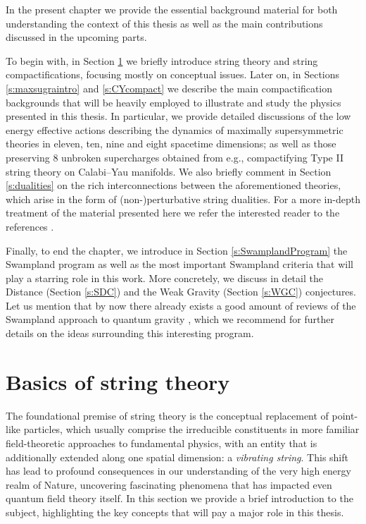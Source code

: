In the present chapter we provide the essential background material for both understanding the context of this thesis as well as the main contributions discussed in the upcoming parts.

To begin with, in Section \ref{s:basicconcepts} we briefly introduce string theory and string compactifications, focusing mostly on conceptual issues. Later on, in Sections \ref{s:maxsugraintro} and \ref{s:CYcompact} we describe the main compactification backgrounds that will be heavily employed to illustrate and study the physics presented in this thesis. In particular, we provide detailed discussions of the low energy effective actions describing the dynamics of maximally supersymmetric theories in eleven, ten, nine and eight spacetime dimensions; as well as those preserving 8 unbroken supercharges obtained from e.g., compactifying Type II string theory on Calabi--Yau manifolds. We also briefly comment in Section \ref{s:dualities} on the rich interconnections between the aforementioned theories, which arise in the form of (non-)perturbative string dualities. For a more in-depth treatment of the material presented here we refer the interested reader to the references \cite{Green:2012oqa,Green:2012pqa,Aspinwall:1996mn,Polchinski:1998rq,Polchinski:1998rr,Hori:2003ic,Becker:2006dvp,Ibanez:2012zz,Blumenhagen:2013fgp}.

Finally, to end the chapter, we introduce in Section \ref{s:SwamplandProgram} the Swampland program as well as the most important Swampland criteria that will play a starring role in this work. More concretely, we discuss in detail the Distance (Section \ref{s:SDC}) and the Weak Gravity (Section \ref{s:WGC}) conjectures. Let us mention that by now there already exists a good amount of reviews of the Swampland approach to quantum gravity \cite{Brennan:2017rbf,Palti:2019pca,vanBeest:2021lhn,Grana:2021zvf,Harlow:2022gzl,Agmon:2022thq,VanRiet:2023pnx}, which we recommend for further details on the ideas surrounding this interesting program.



\section{Basics of string theory} \label{s:basicconcepts}

The foundational premise of string theory is the conceptual replacement of point-like particles, which usually comprise the irreducible constituents in more familiar field-theoretic approaches to fundamental physics, with an entity that is additionally extended along one spatial dimension: a \emph{vibrating string}. This shift has lead to profound consequences in our understanding of the very high energy realm of Nature, uncovering fascinating phenomena that has impacted even quantum field theory itself. In this section we provide a brief introduction to the subject, highlighting the key concepts that will pay a major role in this thesis.

